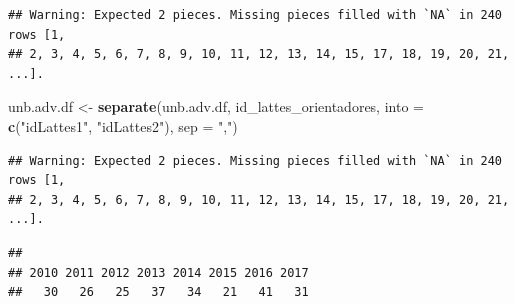 \documentclass[]{article}
\newenvironment{Shaded}{\begin{snugshade}}{\end{snugshade}}
\newcommand{\KeywordTok}[1]{\textcolor[rgb]{0.13,0.29,0.53}{\textbf{#1}}}
\newcommand{\DataTypeTok}[1]{\textcolor[rgb]{0.13,0.29,0.53}{#1}}
\newcommand{\DecValTok}[1]{\textcolor[rgb]{0.00,0.00,0.81}{#1}}
\newcommand{\StringTok}[1]{\textcolor[rgb]{0.31,0.60,0.02}{#1}}
\newcommand{\CommentTok}[1]{\textcolor[rgb]{0.56,0.35,0.01}{\textit{#1}}}
\newcommand{\OtherTok}[1]{\textcolor[rgb]{0.56,0.35,0.01}{#1}}
\newcommand{\OperatorTok}[1]{\textcolor[rgb]{0.81,0.36,0.00}{\textbf{#1}}}
\newcommand{\NormalTok}[1]{#1}
\begin{document}
\begin{verbatim}
## Warning: Expected 2 pieces. Missing pieces filled with `NA` in 240 rows [1,
## 2, 3, 4, 5, 6, 7, 8, 9, 10, 11, 12, 13, 14, 15, 17, 18, 19, 20, 21, ...].
\end{verbatim}

\begin{Shaded}
\begin{Highlighting}[]
\NormalTok{unb.adv.df <-}\StringTok{ }\KeywordTok{separate}\NormalTok{(unb.adv.df, id_lattes_orientadores, }\DataTypeTok{into =} \KeywordTok{c}\NormalTok{(}\StringTok{"idLattes1"}\NormalTok{, }\StringTok{"idLattes2"}\NormalTok{), }\DataTypeTok{sep =} \StringTok{","}\NormalTok{)}
\end{Highlighting}
\end{Shaded}

\begin{verbatim}
## Warning: Expected 2 pieces. Missing pieces filled with `NA` in 240 rows [1,
## 2, 3, 4, 5, 6, 7, 8, 9, 10, 11, 12, 13, 14, 15, 17, 18, 19, 20, 21, ...].
\end{verbatim}

\begin{Shaded}
\end{Shaded}

\begin{verbatim}
## 
## 2010 2011 2012 2013 2014 2015 2016 2017 
##   30   26   25   37   34   21   41   31
\end{verbatim}

\begin{Shaded}
\end{Shaded}
\end{document}
